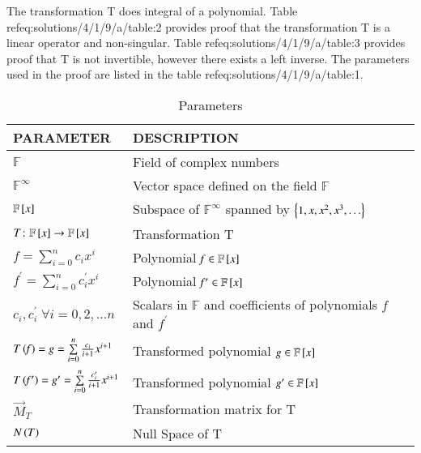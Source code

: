 The transformation T does integral of a polynomial. Table ref{eq:solutions/4/1/9/a/table:2} provides proof that the transformation T is a linear operator and non-singular. Table ref{eq:solutions/4/1/9/a/table:3} provides proof that T is not invertible, however there exists a left inverse. The parameters used in the proof are listed in the table ref{eq:solutions/4/1/9/a/table:1}.
\begin{table*}[ht!]
\begin{center}
\begin{tabular}{|l|l|}
\hline
\textbf{PARAMETER} & \textbf{DESCRIPTION}\\[0.5ex]
\hline
$\mathbb{F}$ & Field of complex numbers\\[0.5ex]
\hline
$\mathbb{F}^{\infty}$ & Vector space defined on the field $\mathbb{F}$\\[0.5ex]
\hline
$\mathbb{F}{}\left[x\right]$ & Subspace of $\mathbb{F}^{\infty}$ spanned by $\left\{1,x,x^2,x^3,\hdots\right\}$\\[0.5ex] 
\hline
$T\colon \mathbb{F}{}\left[x\right] \rightarrow \mathbb{F}{}\left[x\right]$ & Transformation T\\[0.5ex] 
\hline
$\mathit{f}=\sum \limits_{i=0}^n c_i x^i$ & Polynomial $\mathit{f} \in \mathbb{F}{}\left[x\right]$\\[0.5ex] 
\hline
$\mathit{f^\prime}=\sum \limits_{i=0}^n c^\prime_i x^i$ & Polynomial $\mathit{f^\prime} \in \mathbb{F}{}\left[x\right]$\\[0.5ex] 
\hline
$c_i,c^\prime_i \; \forall i=0,2,\hdots n$ & Scalars in $\mathbb{F}$ and coefficients of polynomials $\mathit{f}$ and $\mathit{f^\prime}$\\[0.5ex] 
\hline
$T\left(\mathit{f}\right)=\mathit{g}=\sum \limits_{i=0}^n \frac{c_i}{i+1} x^{i+1}$ & Transformed polynomial $\mathit{g}\in \mathbb{F}{}\left[x\right]$
\\[0.5ex] 
\hline
$T\left(\mathit{f^\prime}\right)=\mathit{g^\prime}=\sum \limits_{i=0}^n \frac{c_i^\prime}{i+1} x^{i+1}$ & Transformed polynomial $\mathit{g^\prime}\in \mathbb{F}{}\left[x\right]$
\\[0.5ex] 
\hline
$\vec{M}_T$ & Transformation matrix for T\\[0.5ex] 
\hline
$N\left(T\right)$ & Null Space of T\\[0.5ex] 
\hline
\end{tabular}
\caption{Parameters}
\label{eq:solutions/4/1/9/a/table:1}
\end{center}

\end{table*}

